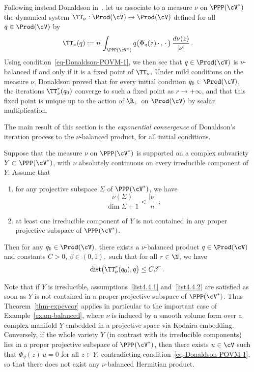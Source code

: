 Following instead Donaldson in~\cite{D}, let us associate to a measure $\nu$ on $\PPP(\cV^*)$ the dynamical system $\TT_\nu:\Prod(\cV)\rightarrow\Prod(\cV)$ defined for all $q\in\Prod(\cV)$ by
\begin{equation}\label{Tnudefcan}
\TT_\nu(q):=n\,\int_{\PPP (\cV^*)} q\big(\Phi_q(z)\,\cdot\,,\,\cdot\,\big)
\,\frac{d\nu(z)}{|\nu|}\,.
\end{equation}
Using condition~\eqref{eq-Donaldson-POVM-1}, we then see that $q\in\Prod(\cV)$ is $\nu$-balanced if and only if it is a fixed point of $\TT_\nu$. Under mild conditions on the measure $\nu$, Donaldson proved that for every initial condition $q_0\in\Prod(\cV)$, the iterations $\TT_\nu^r (q_0)$ converge to such a fixed point as $r \to +\infty$, and that this fixed point is unique up to the action of $\R_+$ on $\Prod(\cV)$ by scalar multiplication.

The main result of this section is the \emph{exponential convergence} of Donaldson's iteration process to the $\nu$-balanced product, for all initial conditions.

\begin{theo}\label{thm-expcvcor}
Suppose that the measure $\nu$ on $\PPP(\cV^*)$ is supported on a complex subvariety $Y \subset \PPP(\cV^*)$, with $\nu$ absolutely continuous on every irreducible component of $Y$. Assume that
\begin{enumerate}\romanenumi
\item \label{list4.4.1}for any projective subspace $\Sigma$ of $\PPP(\cV^*)$, we have
\begin{equation}\label{eq-spade-1}
\frac{\nu(\Sigma)}{\dim \Sigma +1} < \frac{|\nu|}{n}\;;
\end{equation}
\item \label{list4.4.2} at least one irreducible component of $Y$ is not contained in any proper projective subspace of $\PPP(\cV^*)$.
\end{enumerate}
Then for any $q_0\in\Prod(\cV)$, there exists a $\nu$-balanced product $q\in\Prod(\cV)$ and constants $C>0,\,\beta\in(0,1),$ such that for all $r\in\N$, we have
\begin{equation}\label{expcvest}
\textup{dist}\big(\TT_\nu^r(q_0),q\big)\leq C\beta^r\;.
\end{equation}
\end{theo}



Note that if $Y$ is irreducible, assumptions~\eqref{list4.4.1} and~\eqref{list4.4.2} are satisfied as soon as $Y$ is not contained in a proper projective subspace of $\PPP(\cV^*)$. Thus Theorem~\ref{thm-expcvcor} applies in particular to the important case of Example~\ref{exam-balanced}, where $\nu$ is induced by a smooth volume form over a complex manifold $Y$ embedded in a projective space via Kodaira embedding. Conversely, if the whole variety $Y$ (in contrast with its irreducible components) lies in a proper projective subspace of $\PPP(\cV^*)$, then there exists $u\in\cV$ such that $\Phi_q(z)\,u=0$ for all $z\in Y$, contradicting condition~\eqref{eq-Donaldson-POVM-1}, so that there does not exist any $\nu$-balanced Hermitian product.

